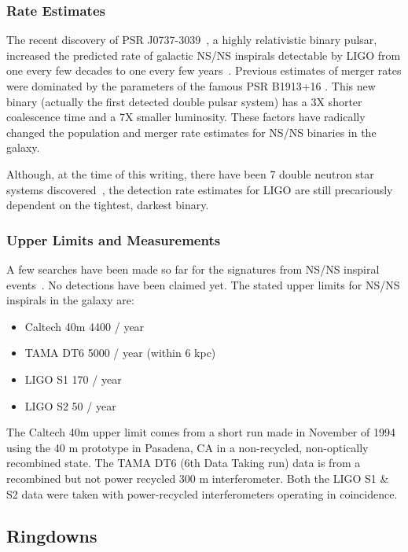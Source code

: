 \subsubsection{Rate Estimates}

The recent discovery of PSR J0737-3039~\cite{Parkes:Nature}, a highly relativistic 
binary pulsar,
increased the predicted rate of galactic NS/NS inspirals detectable by LIGO
from one every few decades to one every few years~\cite{Vicki:Rates}. 
Previous estimates of
merger rates were dominated by the parameters of the famous 
PSR B1913+16 \cite{Hulse:Pulsar,Taylor:1913}. This new binary (actually the
first detected double pulsar system) has a 3X shorter coalescence time and
a 7X smaller luminosity. These factors have radically changed the population
and merger rate estimates for NS/NS binaries in the galaxy.

Although, at the time of this writing, there have been 
7 double neutron star systems discovered~\cite{Taylor:1829}, the 
detection rate estimates for LIGO are 
still precariously dependent on the tightest, darkest binary.


\subsubsection{Upper Limits and Measurements}

A few searches have been made so far for the signatures from NS/NS inspiral
events~\cite{S1:Inspiral,40m:Inspiral,TAMA:Inspiral}. No detections have been
claimed yet. The stated upper limits for NS/NS inspirals in the galaxy are:

\begin{itemize}
\item Caltech 40m  4400 / year
\item TAMA DT6  5000 / year (within 6 kpc) 
\item LIGO S1  170 /  year
\item LIGO S2  50 / year
\end{itemize}
The Caltech 40m upper limit comes from a short run made in November of 1994
using the 40 m prototype in Pasadena, CA in a non-recycled, non-optically
recombined state. The TAMA DT6 (6th Data Taking run) data is from a 
recombined but not power recycled
300 m interferometer. Both the LIGO S1 \& S2 data were taken with power-recycled
interferometers operating in coincidence.


\subsection{Ringdowns}
\label{sec:Ringdowns}

